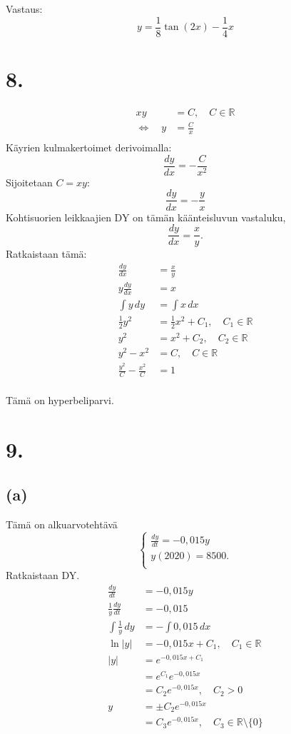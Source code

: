 \documentclass{article}
\begin{document}
Vastaus:
\[
  y = \frac{1}{8} \tan(2x) - \frac{1}{4}x
\]

\section*{8.}

\begin{align*}
  xy &= C, \quad C \in \mathbb{R} \\
  \iff \quad y &= \frac{C}{x} \\
\end{align*}
Käyrien kulmakertoimet derivoimalla:
\[
  \frac{dy}{dx} = -\frac{C}{x^2}
\]
Sijoitetaan $C = xy$:
\[
  \frac{dy}{dx} = -\frac{y}{x}
\]
Kohtisuorien leikkaajien DY on tämän käänteisluvun vastaluku,
\[
  \frac{dy}{dx} = \frac{x}{y}.
\]
Ratkaistaan tämä:
\begin{align*}
  \frac{dy}{dx} &= \frac{x}{y} \\
  y\frac{dy}{dx} &= x \\
  \int y \,dy &= \int x \,dx \\
  \frac{1}{2} y^2 &= \frac{1}{2} x^2 + C_1, \quad C_1 \in \mathbb{R} \\
  y^2 &= x^2 + C_2, \quad C_2 \in \mathbb{R} \\
  y^2 - x^2 &= C, \quad C \in \mathbb{R} \\
  \frac{y^2}{C} - \frac{x^2}{C} &= 1 \\
\end{align*}

Tämä on hyperbeliparvi.

\section*{9.}

\subsection*{(a)}

Tämä on alkuarvotehtävä
\[
  \begin{cases}
    \frac{dy}{dt} = -0,015y \\
    y(2020) = 8500. \\
  \end{cases}
\]
Ratkaistaan DY.
\begin{align*}
  \frac{dy}{dt} &= -0,015y \\
  \frac{1}{y} \frac{dy}{dt} &= -0,015 \\
  \int \frac{1}{y} \,dy &= -\int 0,015 \,dx \\
  \ln |y| &= -0,015x + C_1, \quad C_1 \in \mathbb{R} \\
  |y| &= e^{-0,015x + C_1} \\
      &= e^{C_1} e^{-0,015x} \\
      &= C_2 e^{-0,015x}, \quad C_2 > 0 \\
  y &= \pm C_2 e^{-0,015x} \\
    &= C_3 e^{-0,015x}, \quad C_3 \in \mathbb{R} \setminus \{0\} \\
\end{align*}
\end{document}
